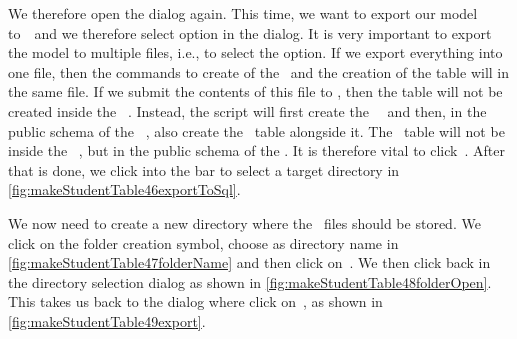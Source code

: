 We therefore open the  dialog again.
This time, we want to export our model to~\sql\ and we therefore select  option in the  dialog.
It is very important to export the model to multiple files, i.e., to select the  option.
If we export everything into one file, then the commands to create of the  \db\ and the creation of the  table will in the same file.
If we submit the contents of this file to \psql, then the  table will not be created inside the ~\db.
Instead, the script will first create the ~\db\ and then, in the public schema of the \postgresql\ , also create the ~table alongside it.
The ~table will not be inside the ~\db, but in the public schema of the \dbms.
It is therefore vital to click~.
After that is done, we click into the  bar to select a target directory in \cref{fig:makeStudentTable46exportToSql}.

We now need to create a new directory where the \sql\ files should be stored.
We click on the folder creation symbol, choose  as directory name in \cref{fig:makeStudentTable47folderName} and then click on~.
We then click  back in the directory selection dialog as shown in \cref{fig:makeStudentTable48folderOpen}.
This takes us back to the  dialog where click on~, as shown in \cref{fig:makeStudentTable49export}.

